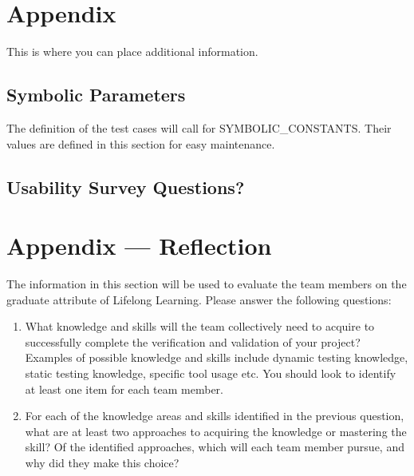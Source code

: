 \documentclass[12pt, titlepage]{article}
\begin{document}
				




\newpage

\section{Appendix}

This is where you can place additional information.

\subsection{Symbolic Parameters}

The definition of the test cases will call for SYMBOLIC\_CONSTANTS.
Their values are defined in this section for easy maintenance.

\subsection{Usability Survey Questions?}



\newpage{}
\section*{Appendix --- Reflection}

The information in this section will be used to evaluate the team members on the
graduate attribute of Lifelong Learning.  Please answer the following questions:

\begin{enumerate}
  \item What knowledge and skills will the team collectively need to acquire to
  successfully complete the verification and validation of your project?
  Examples of possible knowledge and skills include dynamic testing knowledge,
  static testing knowledge, specific tool usage etc.  You should look to
  identify at least one item for each team member.
  \item For each of the knowledge areas and skills identified in the previous
  question, what are at least two approaches to acquiring the knowledge or
  mastering the skill?  Of the identified approaches, which will each team
  member pursue, and why did they make this choice?
\end{enumerate}
\end{document}
